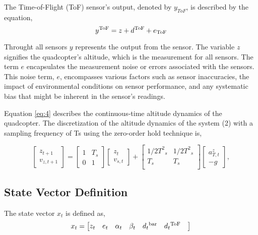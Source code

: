 \documentclass{article}
\begin{document}
The Time-of-Flight (ToF) sensor's output, denoted by \( y_{ToF} \), is described by the equation,
\begin{equation}
y^{\rm ToF} = z + d^{\rm ToF} + e_{\rm ToF}
\end{equation}


Throught all sensors \( y \) represents the output from the sensor. The variable \( z \) signifies the quadcopter's altitude, which is the measurement for all sensors. The term \( e \) encapsulates the measurement noise or errors associated with the sensors. This noise term, \( e \), encompasses various factors such as sensor inaccuracies, the impact of environmental conditions on sensor performance, and any systematic bias that might be inherent in the sensor's readings.

Equation \eqref{eq:4} describes the continuous-time altitude dynamics of the quadcopter. 
The discretization of the altitude dynamics of the system (2) with a sampling frequency of Ts using the zero-order hold technique is,

\begin{equation}
    \begin{bmatrix}
    z_{t+1}\\
    v_{z,t+1}
    \end{bmatrix} =
    \begin{bmatrix}
    1 & T_s \\
    0 & 1 
    \end{bmatrix}
    \begin{bmatrix}
    z_t\\
    v_{s,t}
    \end{bmatrix} + 
    \begin{bmatrix}
    {1/2}{T^2}_s & {1/2}{T^2}_s \\
    T_s & T_s \\ 
    \end{bmatrix}
    \begin{bmatrix}
    a_{T,t}^z \\ 
    -g
    \end{bmatrix},
\end{equation}
\subsection{State Vector Definition}
The state vector \( x_t \) is defined as,
\begin{equation}
    x_t = 
    \begin{bmatrix}
        z_t &
        e_{t} & 
        \alpha_t & 
        \beta_t &
        d{_t}^{\rm bar}&
        d{_t}^{\rm ToF}&
    \end{bmatrix}
\end{equation}
\end{document}
